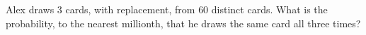 Alex draws $3$ cards, with replacement, from $60$ distinct cards. What is the probability, to the nearest millionth, that he draws the same card all three times?
